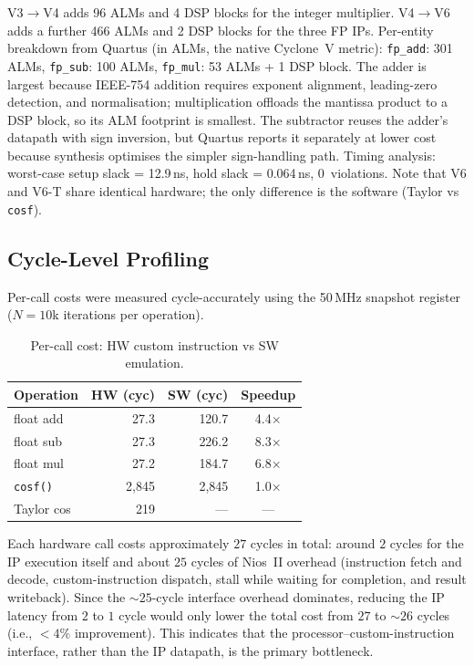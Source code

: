 \documentclass[a4paper,10pt,twocolumn]{article}
\begin{document}
V3$\to$V4 adds 96 ALMs and 4 DSP blocks for the integer multiplier.
V4$\to$V6 adds a further 466 ALMs and 2 DSP blocks for the three FP IPs.
Per-entity breakdown from Quartus (in ALMs, the native Cyclone~V metric): \texttt{fp\_add}: 301 ALMs, \texttt{fp\_sub}: 100 ALMs, \texttt{fp\_mul}: 53 ALMs + 1 DSP block.
The adder is largest because IEEE-754 addition requires exponent alignment, leading-zero detection, and normalisation; multiplication offloads the mantissa product to a DSP block, so its ALM footprint is smallest.
The subtractor reuses the adder's datapath with sign inversion, but Quartus reports it separately at lower cost because synthesis optimises the simpler sign-handling path.
Timing analysis: worst-case setup slack = 12.9\,ns, hold slack = 0.064\,ns, 0~violations.
Note that V6 and V6-T share identical hardware; the only difference is the software (Taylor vs \texttt{cosf}).

\subsection{Cycle-Level Profiling}

Per-call costs were measured cycle-accurately using the 50\,MHz snapshot register ($N\!=\!10$k iterations per operation).

\begin{table}[H]
\centering
\caption{Per-call cost: HW custom instruction vs SW emulation.}
\label{tab:t6_cycles}
\small
\begin{tabular}{lrrc}
\toprule
\textbf{Operation} & \textbf{HW (cyc)} & \textbf{SW (cyc)} & \textbf{Speedup} \\
\midrule
float add       & 27.3  & 120.7   & 4.4$\times$ \\
float sub       & 27.3  & 226.2   & 8.3$\times$ \\
float mul       & 27.2  & 184.7   & 6.8$\times$ \\
\texttt{cosf()} & 2{,}845 & 2{,}845 & 1.0$\times$ \\
Taylor cos      & 219   & ---     & --- \\
\bottomrule
\end{tabular}
\end{table}

Each hardware call costs approximately $27$ cycles in total:
around $2$ cycles for the IP execution itself and about $25$ cycles
of Nios~II overhead (instruction fetch and decode, custom-instruction
dispatch, stall while waiting for completion, and result writeback).
Since the $\sim 25$-cycle interface overhead dominates,
reducing the IP latency from $2$ to $1$ cycle would only lower
the total cost from $27$ to $\sim 26$ cycles (i.e., $<4\%$ improvement).
This indicates that the processor--custom-instruction interface,
rather than the IP datapath, is the primary bottleneck.
\end{document}
